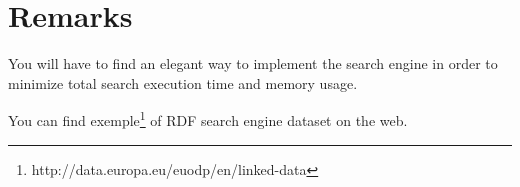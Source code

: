 \documentclass{llncs}
\begin{document}
\section*{Remarks}
You will have to find an elegant way to implement the search engine in order to minimize total search execution time and memory usage.

You can find exemple\footnote{http://data.europa.eu/euodp/en/linked-data} of RDF search engine dataset on the web.



\end{document}
